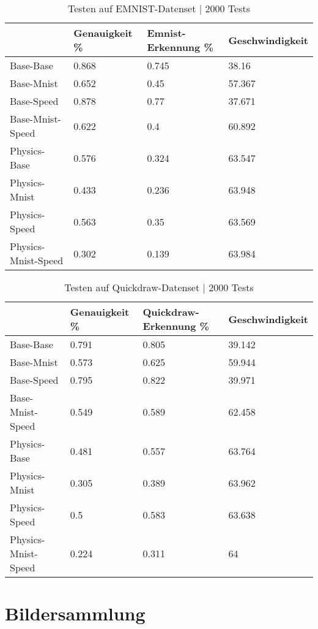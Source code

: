 \begin{table}[!ht]
    \centering
    \caption{Testen auf EMNIST-Datenset | 2000 Tests}
    \begin{tabular}{|l|l|l|l|}
    \hline
        ~ & Genauigkeit \% & Emnist-Erkennung \% & Geschwindigkeit \\ \hline
        Base-Base & 0.868 & 0.745 & 38.16 \\ \hline
        Base-Mnist & 0.652 & 0.45 & 57.367 \\ \hline
        Base-Speed & 0.878 & 0.77 & 37.671 \\ \hline
        Base-Mnist-Speed & 0.622 & 0.4 & 60.892 \\ \hline
        Physics-Base & 0.576 & 0.324 & 63.547 \\ \hline
        Physics-Mnist & 0.433 & 0.236 & 63.948 \\ \hline
        Physics-Speed & 0.563 & 0.35 & 63.569 \\ \hline
        Physics-Mnist-Speed & 0.302 & 0.139 & 63.984 \\ \hline
    \end{tabular}
    \label{tab:EMNIST}
\end{table}

\begin{table}[!ht]
    \centering
    \caption{Testen auf Quickdraw-Datenset | 2000 Tests}
    \begin{tabular}{|l|l|l|l|}
    \hline
        ~ & Genauigkeit \% & Quickdraw-Erkennung \% & Geschwindigkeit \\ \hline
        Base-Base & 0.791 & 0.805 & 39.142 \\ \hline
        Base-Mnist & 0.573 & 0.625 & 59.944 \\ \hline
        Base-Speed & 0.795 & 0.822 & 39.971 \\ \hline
        Base-Mnist-Speed & 0.549 & 0.589 & 62.458 \\ \hline
        Physics-Base & 0.481 & 0.557 & 63.764 \\ \hline
        Physics-Mnist & 0.305 & 0.389 & 63.962 \\ \hline
        Physics-Speed & 0.5 & 0.583 & 63.638 \\ \hline
        Physics-Mnist-Speed & 0.224 & 0.311 & 64 \\ \hline
    \end{tabular}
    \label{tab:Quickdraw}
\end{table}

\section{Bildersammlung}
